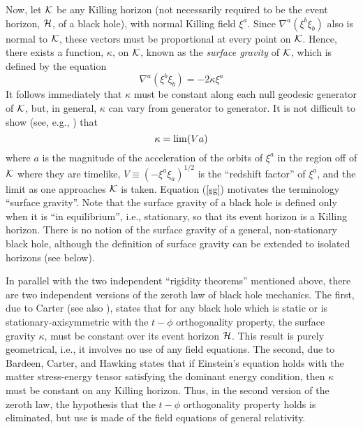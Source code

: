 \documentclass[12pt]{article}
\begin{document}
Now, let ${\cal K}$ be any Killing horizon (not necessarily required
to be the event horizon, ${\cal H}$, of a black hole), with normal
Killing field $\xi^a$. Since $\nabla^a (\xi^b \xi_b)$ also is normal
to ${\cal K}$, these vectors must be proportional at every point on
${\cal K}$. Hence, there exists a function, $\kappa$, on ${\cal K}$,
known as the {\em surface gravity} of ${\cal K}$, which is defined by
the equation
\begin{equation}
\nabla^a (\xi^b \xi_b) = -2 \kappa \xi^a
\label{kappa}
\end{equation}
It follows immediately that $\kappa$ must be constant along each null
geodesic generator of ${\cal K}$, but, in general, $\kappa$ can vary
from generator to generator. It is not difficult to show (see, e.g.,
\cite{w3}) that
\begin{equation}
\kappa = {\rm lim} (Va)
\label{sg}
\end{equation}
where $a$ is the magnitude of the acceleration of the orbits of
$\xi^a$ in the region off of $\cal K$ where they are timelike, $V
\equiv (- \xi^a \xi_a)^{1/2}$ is the ``redshift factor'' of $\xi^a$,
and the limit as one approaches ${\cal K}$ is taken. Equation
(\ref{sg}) motivates the terminology ``surface gravity''. Note that
the surface gravity of a black hole is defined only when it is ``in
equilibrium'', i.e., stationary, so that its event horizon is a
Killing horizon. There is no notion of the surface gravity of a
general, non-stationary black hole, although the definition of surface
gravity can be extended to isolated horizons (see below).

In parallel with the two independent ``rigidity theorems'' mentioned
above, there are two independent versions of the zeroth law of black
hole mechanics. The first, due to Carter \cite{c} (see also
\cite{rw2}), states that for any black hole which is static or is
stationary-axisymmetric with the $t - \phi$ orthogonality property,
the surface gravity $\kappa$, must be constant over its event horizon
${\cal H}$. This result is purely geometrical, i.e., it involves no
use of any field equations. The second, due to Bardeen, Carter, and
Hawking \cite{bch} states that if Einstein's equation holds with the
matter stress-energy tensor satisfying the dominant energy condition,
then $\kappa$ must be constant on any Killing horizon. Thus, in the
second version of the zeroth law, the hypothesis that the $t - \phi$
orthogonality property holds is eliminated, but use is made of the
field equations of general relativity.
\end{document}
